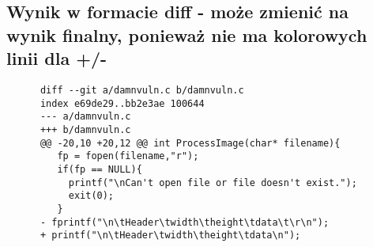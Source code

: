 \subsection{Wynik w formacie diff - może zmienić na wynik finalny, ponieważ nie ma kolorowych linii dla +/-}
\begin{listing}[H]
    \begin{verbatim}
      diff --git a/damnvuln.c b/damnvuln.c
      index e69de29..bb2e3ae 100644
      --- a/damnvuln.c
      +++ b/damnvuln.c
      @@ -20,10 +20,12 @@ int ProcessImage(char* filename){
         fp = fopen(filename,"r"); 
         if(fp == NULL){
           printf("\nCan't open file or file doesn't exist.");
           exit(0);
         }
      -	fprintf("\n\tHeader\twidth\theight\tdata\t\r\n");
      +	printf("\n\tHeader\twidth\theight\tdata\n");
       

\end{verbatim}
\end{listing}
